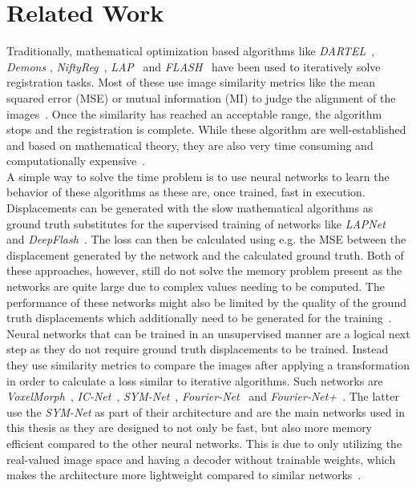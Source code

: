 \section{Related Work} \label{Sec:RelatedWork}
Traditionally, mathematical optimization based algorithms like \emph{DARTEL}~\cite{DARTEL}, \emph{Demons} \cite{Vercauteren2009}, \emph{NiftyReg}~\cite{NiftiReg}, \emph{LAP}~\cite{LAP} and \emph{FLASH}~\cite{FLASH} have been used to iteratively solve registration tasks. Most of these use image similarity metrics like the mean squared error (MSE) or mutual information (MI) to judge the alignment of the images~\cite{Fu2020}. Once the similarity has reached an acceptable range, the algorithm stops and the registration is complete. While these algorithm are well-established and based on mathematical theory, they are also very time consuming and computationally expensive~\cite{Chen2023}.\\
A simple way to solve the time problem is to use neural networks to learn the behavior of these algorithms as these are, once trained, fast in execution. Displacements can be generated with the slow mathematical algorithms as ground truth substitutes for the supervised training of networks like \emph{LAPNet}~\cite{LAPNet} and \emph{DeepFlash}~\cite{DeepFlash}. The loss can then be calculated using e.g. the MSE between the displacement generated by the network and the calculated ground truth. Both of these approaches, however, still do not solve the memory problem present as the networks are quite large due to complex values needing to be computed. The performance of these networks might also be limited by the quality of the ground truth displacements which additionally need to be generated for the training~\cite{Chen2020,Zou2022}.\\
Neural networks that can be trained in an unsupervised manner are a logical next step as they do not require ground truth displacements to be trained. Instead they use similarity metrics to compare the images after applying a transformation in order to calculate a loss similar to iterative algorithms. Such networks are \emph{VoxelMorph}~\cite{Voxelmorph}, \emph{IC-Net}~\cite{IC-Net}, \emph{SYM-Net}~\cite{SYM-Net}, \emph{Fourier-Net}~\cite{Fourier-Net} and \emph{Fourier-Net+}~\cite{Fourier-Net+}. The latter use the \emph{SYM-Net} as part of their architecture and are the main networks used in this thesis as they are designed to not only be fast, but also more memory efficient compared to the other neural networks. This is due to only utilizing the real-valued image space and having a decoder without trainable weights, which makes the architecture more lightweight compared to similar networks~\cite{Fourier-Net,Fourier-Net+}.\\
